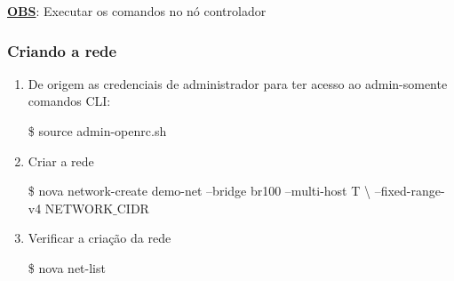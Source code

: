 \textbf{\underline{OBS}}: Executar os comandos no nó controlador

\subsubsection{Criando a rede}
\begin{enumerate}
\item De origem as credenciais de administrador para ter acesso ao admin-somente comandos CLI:
		\begin{snugshade}
			\$ source admin-openrc.sh
		\end{snugshade}			
		
\item Criar a rede
		\begin{snugshade}
			\$ nova network-create demo-net --bridge br100 --multi-host T \textbackslash
--fixed-range-v4 NETWORK$\_$CIDR
		\end{snugshade}			
		
\item Verificar a criação da rede
		\begin{snugshade}
			\$ nova net-list
		\end{snugshade}			
\end{enumerate}
